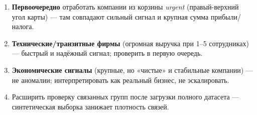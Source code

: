 \documentclass[
]{article}
\providecommand{\tightlist}{%
  \setlength{\itemsep}{0pt}\setlength{\parskip}{0pt}}
\begin{document}
\begin{enumerate}
\def\labelenumi{\arabic{enumi}.}
\tightlist
\item
  \textbf{Первоочередно} отработать компании из корзины \emph{urgent}
  (правый-верхний угол карты) --- там совпадают сильный сигнал и крупная
  сумма прибыли/налога.
\item
  \textbf{Технические/транзитные фирмы} (огромная выручка при 1--5
  сотрудниках) --- быстрый и надёжный сигнал; проверить в первую
  очередь.
\item
  \textbf{Экономические сигналы} (крупные, но «чистые» и стабильные
  компании) --- не аномалии; интерпретировать как реальный бизнес, не
  эскалировать.
\item
  Расширить проверку связанных групп после загрузки полного датасета ---
  синтетическая выборка занижает плотность связей.
\end{enumerate}
\end{document}
